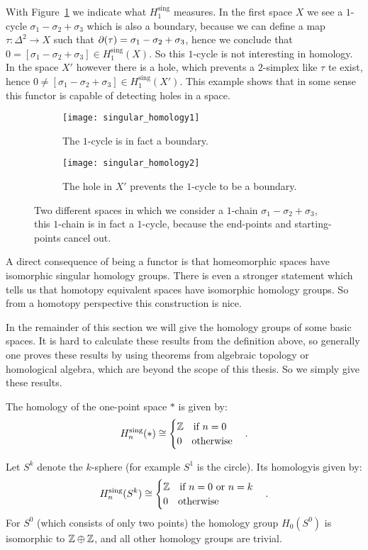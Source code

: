 With Figure~\ref{fig:singular_homology} we indicate what $H^\text{sing}_1$ measures. In the first space $X$ we see a $1$-cycle $\sigma_1-\sigma_2+\sigma_3$ which is also a boundary, because we can define a map $\tau: \Delta^2 \to X$ such that $\partial(\tau) = \sigma_1-\sigma_2+\sigma_3$, hence we conclude that $0 = [\sigma_1-\sigma_2+\sigma_3] \in H^\text{sing}_1(X)$. So this $1$-cycle is not interesting in homology. In the space $X'$ however there is a hole, which prevents a $2$-simplex like $\tau$ te exist, hence $0 \neq [\sigma_1-\sigma_2+\sigma_3] \in H^\text{sing}_1(X')$. This example shows that in some sense this functor is capable of detecting holes in a space.

\begin{figure}[h!]
\begin{subfigure}{.5\textwidth}
  \centering
  \texttt{[image: singular\_homology1]}
  \caption{The $1$-cycle is in fact a boundary.}
\end{subfigure}%
\begin{subfigure}{.5\textwidth}
  \centering
  \texttt{[image: singular\_homology2]}
  \caption{The hole in $X'$ prevents the $1$-cycle to be a boundary.}
\end{subfigure}
\caption{Two different spaces in which we consider a $1$-chain $\sigma_1-\sigma_2+\sigma_3$, this $1$-chain is in fact a $1$-cycle, because the end-points and starting-points cancel out.}
\label{fig:singular_homology}
\end{figure}

A direct consequence of being a functor is that homeomorphic spaces have isomorphic singular homology groups. There is even a stronger statement which tells us that homotopy equivalent spaces have isomorphic homology groups. So from a homotopy perspective this construction is nice.

In the remainder of this section we will give the homology groups of some basic spaces. It is hard to calculate these results from the definition above, so generally one proves these results by using theorems from algebraic topology or homological algebra, which are beyond the scope of this thesis. So we simply give these results.

\begin{example}
	The homology of the one-point space $\ast$ is given by:
	$$ H^\text{sing}_n(\ast) \cong
	\begin{cases}
		\mathbb{Z} \quad\text{if } n = 0 \\
		0  \quad\text{otherwise}
	\end{cases}. $$
\end{example}
\begin{example}
	Let $S^k$ denote the $k$-sphere (for example $S^1$ is the circle). Its homologyis given by:
	$$ H^\text{sing}_n(S^k) \cong
	\begin{cases}
		\mathbb{Z} \quad\text{if } n = 0 \text { or } n = k \\
		0  \quad\text{otherwise}
	\end{cases}. $$
	For $S^0$ (which consists of only two points) the homology group $H_0(S^0)$ is isomorphic to $\mathbb{Z} \oplus \mathbb{Z}$, and all other homology groups are trivial.
\end{example}

